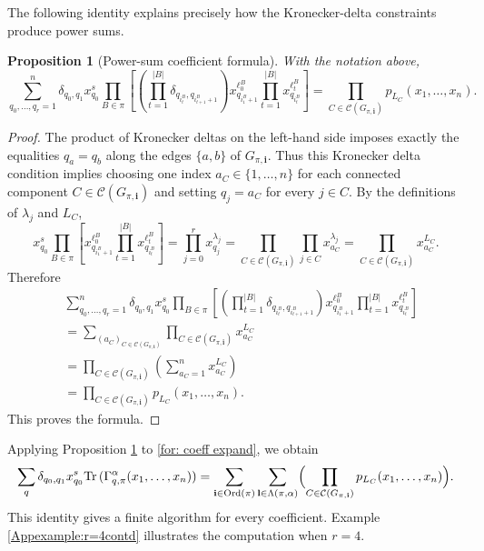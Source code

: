 \documentclass[11pt,reqno]{amsart}
\newtheorem{proposition}[theorem]{Proposition}
\theoremstyle{definition}
\newcommand{\Tr}{\mathrm{Tr} \,}
\newcommand{\bfl}{\mathbf{l}}
\newcommand{\Ord}{\operatorname{Ord}}
\newcommand{\mC}{\mathcal{C}}
\newcommand{\bfi}{\mathbf{i}}
\begin{document}
The following identity explains precisely how the Kronecker-delta
constraints produce power sums.

\begin{proposition}[Power-sum coefficient formula]\label{prop: pow sum coeff}
	With the notation above,
	\begin{equation}
		\sum_{q_0,\ldots,q_r=1}^{n}
			\delta_{q_0,q_1}x_{q_0}^{s}
			\prod_{B\in\pi}
			\left[
			\left(
			\prod_{t=1}^{|B|}
			\delta_{q_{i_t^B},q_{i_{t+1}^B + 1}}
			\right)
			x_{q_{i_1^B + 1}}^{\ell_0^B}
			\prod_{t=1}^{|B|}
			x_{q_{i_t^B}}^{\ell_t^B}
			\right]
			=
			\prod_{C\in\mC(G_{\pi,\bfi})}
			p_{L_C}(x_1,\ldots,x_n).
	\end{equation}
\end{proposition}

\begin{proof}
The product of Kronecker deltas on the left-hand side imposes exactly the equalities \(q_a=q_b\) along the edges \(\{a,b\}\) of \(G_{\pi,\bfi}\).
Thus this Kronecker delta condition implies choosing one index \(a_C\in\{1,\dots,n\}\) for each connected component \(C\in\mC(G_{\pi,\bfi})\) and setting \(q_j=a_C\) for every \(j\in C\).
By the definitions of \(\lambda_j\) and \(L_C\),
\[
	x_{q_0}^{s}
	\prod_{B\in\pi}
	\left[
	x_{q_{i_1^B + 1}}^{\ell_0^B}
	\prod_{t=1}^{|B|}
	x_{q_{i_t^B}}^{\ell_t^B}
	\right]
=
\prod_{j=0}^r x_{q_j}^{\lambda_j}
=
	\prod_{C\in\mC(G_{\pi,\bfi})}
	\prod_{j\in C}x_{a_C}^{\lambda_j}
	=
	\prod_{C\in\mC(G_{\pi,\bfi})}
	x_{a_C}^{L_C}.
\]
Therefore
\[
	\begin{aligned}
		&\sum_{q_0,\ldots,q_r=1}^{n}
		\delta_{q_0,q_1}x_{q_0}^{s}
		\prod_{B\in\pi}
		\left[
		\left(
		\prod_{t=1}^{|B|}
		\delta_{q_{i_t^B},q_{i_{t+1}^B + 1}}
		\right)
		x_{q_{i_1^B + 1}}^{\ell_0^B}
		\prod_{t=1}^{|B|}
		x_{q_{i_t^B}}^{\ell_t^B}
		\right] \\
		&=
		\sum_{(a_C)_{C\in\mC(G_{\pi,\bfi})}}
		\prod_{C\in\mC(G_{\pi,\bfi})}
		x_{a_C}^{L_C} \\
		&=
		\prod_{C\in\mC(G_{\pi,\bfi})}
		\left(\sum_{a_C=1}^{n}x_{a_C}^{L_C}\right) \\
		&=
		\prod_{C\in\mC(G_{\pi,\bfi})}
		p_{L_C}(x_1,\dots,x_n).
	\end{aligned}
\]
This proves the formula.
\end{proof}

Applying Proposition \ref{prop: pow sum coeff} to \eqref{for: coeff expand}, we obtain
\begin{equation}
	\sum_{q} {\delta_{q_0, q_1}}x_{q_0}^s
	\Tr(\Gamma_{ q, \pi} ^\alpha (x_1, \dots, x_n))
	=
	\sum_{\bfi \in \Ord(\pi)}
	\sum_{\bfl \in \Lambda(\pi, \alpha)}
	\Bigl(
	\prod_{C\in\mC(G_{\pi,\bfi})}
	p_{L_C}(x_1,\dots,x_n)
	\Bigr).
\end{equation}
This identity gives a finite algorithm for every coefficient.  Example \ref{Appexample:r=4contd} illustrates the computation when \(r=4\).
\end{document}
